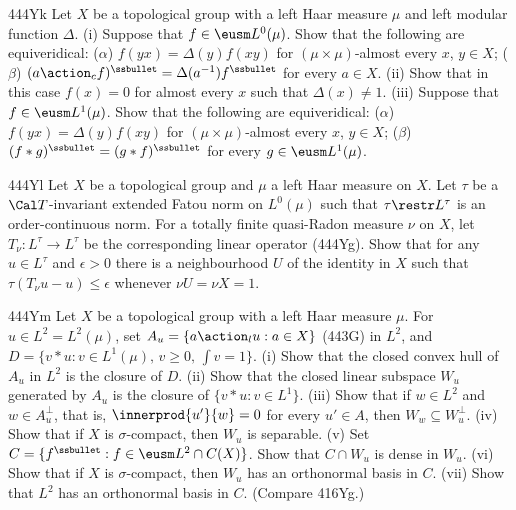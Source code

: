 {\spheader 444Yk Let $X$ be a topological group with a left Haar measure
$\mu$ and left modular function $\Delta$.   (i) Suppose that
$f\in\eusm L^0(\mu)$.   Show that the following are equiveridical:
($\alpha$) $f(yx)=\Delta(y)f(xy)$ for $(\mu\times\mu)$-almost every
$x$, $y\in X$;
($\beta$) $(a\action_cf)^{\ssbullet}=\Delta(a^{-1})f^{\ssbullet}$
for every $a\in X$.
(ii) Show that in this case $f(x)=0$ for almost every $x$ such that
$\Delta(x)\ne 1$.
(iii) Suppose that $f\in\eusm L^1(\mu)$.   Show that the following are
equiveridical:
($\alpha$) $f(yx)=\Delta(y)f(xy)$ for $(\mu\times\mu)$-almost every
$x$, $y\in X$;
($\beta$) $(f*g)^{\ssbullet}=(g*f)^{\ssbullet}$ for every
$g\in\eusm L^1(\mu)$.

\spheader 444Yl Let $X$ be a topological group and $\mu$ a left Haar
measure on $X$.   Let $\tau$ be a $\Cal T$-invariant extended Fatou
norm on $L^0(\mu)$ such that $\tau\restr L^{\tau}$ is an
order-continuous norm.   For a totally finite quasi-Radon measure $\nu$
on $X$, let $T_{\nu}:L^{\tau}\to L^{\tau}$ be the corresponding linear
operator (444Yg).   Show that for any $u\in L^{\tau}$ and $\epsilon>0$
there is a neighbourhood $U$ of the identity in $X$ such that
$\tau(T_{\nu}u-u)\le\epsilon$ whenever $\nu U=\nu X=1$.

\spheader 444Ym Let $X$ be a topological group with a left Haar measure
$\mu$.   For $u\in L^2=L^2(\mu)$, set $A_u=\{a\action_lu:a\in X\}$ (443G)
in $L^2$, and $D=\{v*u:v\in L^1(\mu),\,v\ge 0,\,\int v=1\}$.   (i) Show
that the closed convex hull of $A_u$ in $L^2$ is the closure of $D$.
   (ii) Show that the closed linear
subspace $W_u$ generated by $A_u$ is the closure of $\{v*u:v\in L^1\}$.
(iii) Show that if $w\in L^2$ and $w\in A_u^{\perp}$, that is,
$\innerprod{u'}{w}=0$ for every $u'\in A$, then
$W_w\subseteq W_u^{\perp}$.
(iv) Show that if $X$ is $\sigma$-compact, then $W_u$ is
separable.      (v) Set
$C=\{f^{\ssbullet}:f\in\eusm L^2\cap C(X)\}$.   Show that $C\cap W_u$ is
dense in $W_u$.      (vi) Show
that if $X$ is $\sigma$-compact, then $W_u$ has an orthonormal basis in
$C$.   (vii) Show that $L^2$ has an orthonormal basis in $C$.      (Compare 416Yg.)

}
